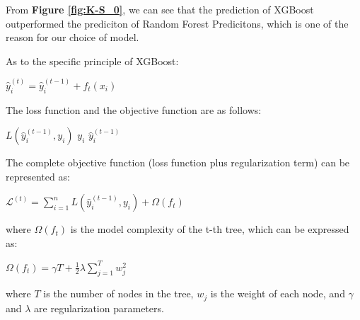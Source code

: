 From \textbf{Figure \ref{fig:K-S_0}}, we can see that the prediction of XGBoost outperformed the prediciton of Random Forest Predicitons, which is one of the reason for our choice of model.

As to the specific principle of XGBoost:

\begin{center}
    $\hat{y}_i^{(t)} = \hat{y}_i^{(t-1)} + f_t(x_i)$
\end{center}

The loss function and the objective function are as follows:

$L(\hat{y}_i^{(t-1)}, y_i)$ \quad {} $y_i$  $\hat{y}_i^{(t-1)}$

The complete objective function (loss function plus regularization term) can be represented as:
\begin{center}
    $\mathcal{L}^{(t)} = \sum_{i=1}^n L(\hat{y}_i^{(t-1)}, y_i) + \Omega(f_t)$
\end{center}

where $\Omega(f_t)$ is the model complexity of the t-th tree, which can be expressed as:

\begin{center}
    $\Omega(f_t) = \gamma T + \frac{1}{2} \lambda \sum_{j=1}^T w_j^2$
\end{center}

where $T$ is the number of nodes in the tree, $w_j$ is the weight of each node, and $\gamma$ and $\lambda$ are regularization parameters.\cite{smith2023predicting}

